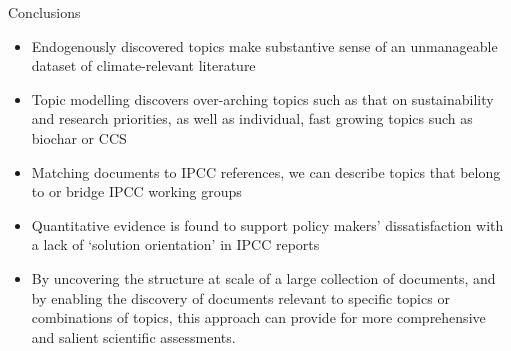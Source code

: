 \documentclass[9pt]{beamer}
\begin{document}
\begin{frame}{Conclusions}


\begin{itemize}
	\item Endogenously discovered topics make substantive sense of an unmanageable dataset of climate-relevant literature
	\item Topic modelling discovers over-arching topics such as that on sustainability and research priorities, as well as individual, fast growing topics such as biochar or CCS
	\item Matching documents to IPCC references, we can describe topics that belong to or bridge IPCC working groups
	\item Quantitative evidence is found to support policy makers' dissatisfaction with a lack of `solution orientation' in IPCC reports \citep{Kowarsch2017} 
	\item By uncovering the structure at scale of a large collection of documents, and by enabling the discovery of documents relevant to specific topics or combinations of topics, this approach can provide for more comprehensive and salient scientific assessments.
\end{itemize}

\end{frame}
\end{document}
